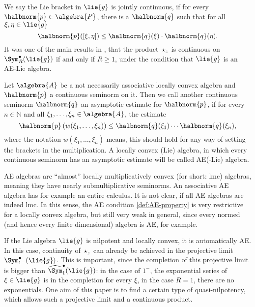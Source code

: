 \documentclass[
11pt,                          %
english                        %
]{article}
\begin{document}
We say the Lie bracket in $\lie{g}$ is jointly continuous, if for every $\halbnorm{p} \in \algebra{P}$, there is a $\halbnorm{q}$ such that for all $\xi, \eta \in \lie{g}$
\begin{equation}
	\label{eq:continuity-of-liebracket}
	\halbnorm{p}([\xi, \eta])
	\leq
	\halbnorm{q}(\xi) \cdot \halbnorm{q}(\eta).
\end{equation}
It was one of the main results in \cite{esposito.stapor.waldmann:2015a:pre}, that the product $\star_z$ is continuous on $\Sym_R^{\bullet}(\lie{g})$ if and only if 
$R \geq 1$, under the condition that $\lie{g}$ is an AE-Lie algebra.
\begin{definition}[AE-algebra]
	Let $\algebra{A}$ be a not necessarily associative locally convex algebra
	and $\halbnorm{p}$ a continuous seminorm on it. Then we call
	another continuous seminorm $\halbnorm{q}$ an asymptotic estimate for 
	$\halbnorm{p}$, if for every $n \in \mathbb{N}$ and all $\xi_1, \ldots, \xi_n
	\in \algebra{A}$, the estimate
	\begin{equation}
		\label{def:AE-property}
		\halbnorm{p}\left(
			w(\xi_1, \ldots, \xi_n)
		\right)
		\leq
		\halbnorm{q}(\xi_1) \cdots \halbnorm{q}(\xi_n),
	\end{equation}
	where the notation $w(\xi_1, \ldots, \xi_n)$ means, this should hold for any
	way of setting the brackets in the multiplication. A locally convex (Lie) 
	algebra, in which every continuous seminorm has an asymptotic estimate will be 
	called AE(-Lie) algebra.
\end{definition}
AE algebras are ``almost'' locally multiplicatively convex (for short: lmc) algebras, 
meaning they have nearly submultiplicative seminorms. An associative AE algebra has 
for example an entire calculus. It is not clear, if all AE algebras are indeed lmc. 
In this sense, the AE condition \eqref{def:AE-property} is very restrictive for a 
locally convex algebra, but still very weak in general, since every normed (and hence 
every finite dimensional) algebra is AE, for example.

If the Lie algebra $\lie{g}$ is nilpotent and locally convex, it is automatically AE. In this case, continuity of $\star_z$ can already be achieved in the projective limit $\Sym_{1^-}^{\bullet}(\lie{g})$. This is important, since the completion of this projective limit is bigger than $\widehat{\Sym}_1^{\bullet}(\lie{g})$: in the case of $1^-$, the exponential series of $\xi \in \lie{g}$ is in the completion for every $\xi$, in the case $R = 1$, there are no exponentials. One aim of this paper is to find a certain type of quasi-nilpotency, which allows such a projective limit and a continuous product.
\end{document}
